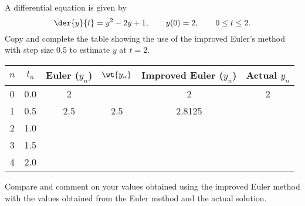 \begin{problem}
    A differential equation is given by \[\der{y}{t} = y^2 - 2y + 1, \qquad y(0) = 2, \qquad 0 \leq t \leq 2.\] Copy and complete the table showing the use of the improved Euler's method with step size $0.5$ to estimate $y$ at $t = 2$.
    \begin{table}[H]
        \centering
        \begin{tabular}{|c|c|c|c|c|c|}
        \hline
        $n$ & $t_n$ & Euler ($y_n$) & $\wt{y_n}$ & Improved Euler ($y_n$) & Actual $y_n$ \\ \hline\hline
        0 & 0.0 & 2 & \cellcolor{black!10} & 2 & 2 \\ \hline
        1 & 0.5 & 2.5 & 2.5 & 2.8125 &  \\ \hline
        2 & 1.0 &  &  &  &  \\ \hline
        3 & 1.5 &  &  &  &  \\ \hline
        4 & 2.0 &  &  &  &  \\ \hline
        \end{tabular}
    \end{table}
    Compare and comment on your values obtained using the improved Euler method with the values obtained from the Euler method and the actual solution.
\end{problem}
